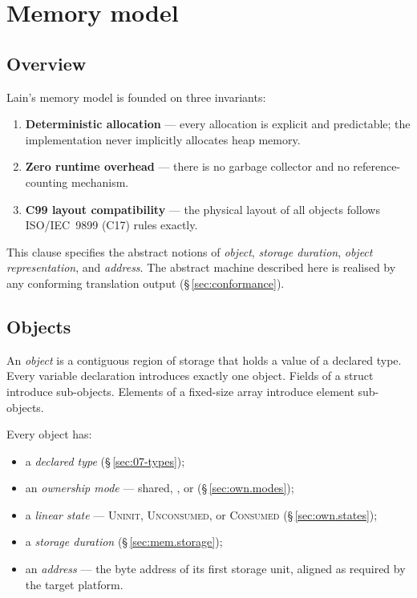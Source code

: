 \chapter{Memory model}
\label{sec:19-memory}

\section{Overview}
\label{sec:mem.overview}

\pnum
Lain's memory model is founded on three invariants:
\begin{enumerate}
  \item \textbf{Deterministic allocation} — every allocation is explicit
        and predictable; the implementation never implicitly allocates
        heap memory.
  \item \textbf{Zero runtime overhead} — there is no garbage collector
        and no reference-counting mechanism.
  \item \textbf{C99 layout compatibility} — the physical layout of all
        objects follows ISO/IEC~9899 (C17) rules exactly.
\end{enumerate}

\pnum
This clause specifies the abstract notions of \textit{object},
\textit{storage duration}, \textit{object representation}, and
\textit{address}.  The abstract machine described here is realised by any
conforming translation output (\S\,\ref{sec:conformance}).

\section{Objects}
\label{sec:mem.objects}

\pnum
An \textit{object} is a contiguous region of storage that holds a value of
a declared type.  Every variable declaration introduces exactly one object.
Fields of a struct introduce sub-objects.  Elements of a fixed-size array
introduce element sub-objects.

\pnum
Every object has:
\begin{itemize}
  \item a \textit{declared type} (\S\,\ref{sec:07-types});
  \item an \textit{ownership mode} — shared, , or 
        (\S\,\ref{sec:own.modes});
  \item a \textit{linear state} — \textsc{Uninit}, \textsc{Unconsumed},
        or \textsc{Consumed} (\S\,\ref{sec:own.states});
  \item a \textit{storage duration} (\S\,\ref{sec:mem.storage});
  \item an \textit{address} — the byte address of its first storage unit,
        aligned as required by the target platform.
\end{itemize}

